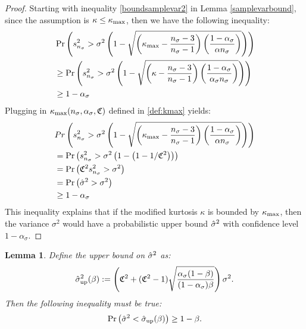 \documentclass{iitthesis}
\newtheorem{lemma}[theorem]{Lemma}
\theoremstyle{definition}
\begin{document}
\begin{proof}
Starting with inequality \eqref{boundsamplevar2} in Lemma \ref{samplevarbound}, since the assumption is $\kappa \leq \kappa_{\max}$, then we have the following inequality: 
\begin{align*}
&\Pr\left( s_{n_{\sigma}}^2 > \sigma^2 \left (1-\sqrt{\left (\kappa_{\max} -\frac{n_{\sigma}-3}{n_{\sigma}-1}\right)\left (\frac{1-\alpha_{\sigma}}{\alpha n_{\sigma}}\right )}\right)\right)\\& \geq\Pr\left( s_{n_{\sigma}}^2 > \sigma^2 \left (1-\sqrt{\left (\kappa-\frac{n_{\sigma}-3}{n_{\sigma}-1}\right)\left (\frac{1-\alpha_{\sigma}}{\alpha_{\sigma} n_{\sigma}}\right )}\right)\right)\\&\geq1-\alpha_{\sigma} 
\end{align*}
 Plugging in $\kappa_{\max}(n_\sigma,\alpha_\sigma, \mathfrak{C})$ defined in \eqref{def:kmax} yields:
 \begin{align*}
&Pr\left( s_{n_{\sigma}}^2 > \sigma^2 \left (1-\sqrt{\left (\kappa_{\max} -\frac{n_{\sigma}-3}{n_{\sigma}-1}\right)\left (\frac{1-\alpha_{\sigma}}{\alpha n_{\sigma}}\right )}\right)\right)\\&
=  \Pr\left( s_{n_{\sigma}}^2 > \sigma^2 \left (1-\left(1-1/\mathfrak{C}^2\right)\right) \right) \\&
=\Pr\left(\mathfrak{C}^2s_{n_{\sigma}}^2  > \sigma^2 \right) \\&
=\Pr\left(\hat{\sigma}^2  > \sigma^2 \right) \\&
\geq  1-\alpha_{\sigma} 
\end{align*}
This inequality explains that if the modified kurtosis $\kappa$ is bounded by $\kappa_{\max}$, then the variance $\sigma^2$ would have a probabilistic upper bound $\hat{\sigma}^2$ with confidence level $1-\alpha_{\sigma}$.
\end{proof}

\begin{lemma}\label{upperboundhsigma}
Define the upper bound on $\hat{\sigma}^2$ as:
\begin{align}\label{sigup}
\hat{\sigma}_{\operatorname{up}}^2 (\beta) := \left(\mathfrak{C}^2+(\mathfrak{C}^2-1)\sqrt{\frac{\alpha_{\sigma}(1-\beta)}{(1-\alpha_{\sigma})\beta}}\right)\sigma^2.
\end{align}
Then the following inequality must be true: 
\begin{align}\label{hsighsigupineq}
\Pr\left(\hat{\sigma}^2 <\hat{\sigma}_{\operatorname{up}}(\beta)\right) \geq 1-\beta.
\end{align}
\end{lemma}
\end{document}
